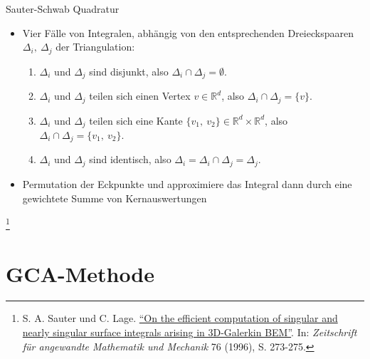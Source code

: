 \documentclass[10pt]{beamer}
\let\svthefootnote\thefootnote
\begin{document}
\begin{frame}{Sauter-Schwab Quadratur}
  \begin{itemize}
    \item Vier Fälle von Integralen, abhängig von den entsprechenden 
          Dreieckspaaren \( \Delta_{i}, \ \Delta_{j} \) der Triangulation:
    \begin{enumerate}
        \item \( \Delta_{i} \) und \( \Delta_{j} \) sind disjunkt, also \(
                 \Delta_{i} \cap \Delta_{j} = \emptyset \).
        \item \( \Delta_{i} \) und \( \Delta_{j} \) teilen sich einen Vertex \(
                 v \in \mathbb{R}^{d} \), also \( \Delta_{i} \cap \Delta_{j} = 
                 \{ v \} \).
        \item \( \Delta_{i} \) und \( \Delta_{j} \) teilen sich eine Kante
              \( \{ v_{1}, \ v_{2} \} \in \mathbb{R}^{d} \times \mathbb{R}^{d} 
              \), also \( \Delta_{i} \cap \Delta_{j} = \{ v_{1}, \ v_{2} \} \).
        \item \( \Delta_{i} \) und \( \Delta_{j} \) sind identisch, also \(
                 \Delta_{i} = \Delta_{i} \cap \Delta_{j} = \Delta_{j} \).
    \end{enumerate}
    \item Permutation der Eckpunkte und approximiere das Integral dann durch
          eine gewichtete Summe von Kernauswertungen
  \end{itemize}

  \footnotesize
  \let\thefootnote\relax\footnote{S. A. Sauter und C. Lage.
  \href{https://link.springer.com/article/10.1007\%2Fs00211-015-0757-y}{
  ``On the efficient computation of singular and nearly singular surface 
  integrals arising in 3D-Galerkin BEM''}. In:   \textit{Zeitschrift f\"ur 
  angewandte Mathematik und Mechanik } 76 (1996), S. 273-275.}
  \addtocounter{footnote}{-1}\let\thefootnote\svthefootnote\relax
  \normalsize
\end{frame}

\section{GCA-Methode}
\end{document}
